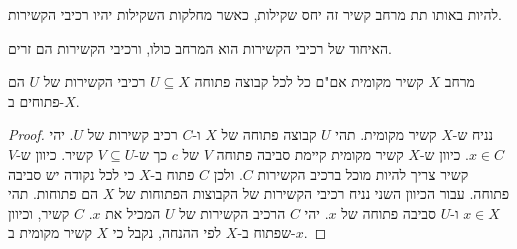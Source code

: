 \documentclass{tstextbook}
\begin{document}
\begin{proposition}
להיות באותו תת מרחב קשיר זה יחס שקילות, כאשר מחלקות השקילות יהיו רכיבי הקשירות.

\end{proposition}
\begin{corollary}
האיחוד של רכיבי הקשירות הוא המרחב כולו, ורכיבי הקשירות הם זרים.

\end{corollary}
\begin{proposition}
מרחב \(X\) קשיר מקומית אם"ם כל לכל קבוצה פתוחה \(U\subseteq X\) רכיבי הקשירות של \(U\) הם פתוחים ב-\(X\).

\end{proposition}
\begin{proof}
נניח ש-\(X\) קשיר מקומית. תהי \(U\) קבוצה פתוחה של \(X\) ו-\(C\) רכיב קשירות של \(U\). יהי \(x \in C\). כיוון ש-\(X\) קשיר מקומית קיימת סביבה פתוחה \(V\) של \(c\) כך ש-\(V\subseteq U\) קשיר. כיוון ש-\(V\) קשיר צריך להיות מוכל ברכיב הקשירות \(C\). ולכן \(C\) פתוח ב-\(X\) כי לכל נקודה יש סביבה פתוחה.
עבור הכיוון השני נניח רכיבי הקשירות של הקבוצות הפתוחות של \(X\) הם פתוחות. תהי \(x \in X\) ו-\(U\) סביבה פתוחה של \(x\). יהי \(C\) הרכיב הקשירות של \(U\) המכיל את \(x\). \(C\) קשיר, וכיוון שפתוח ב-\(X\) לפי ההנחה, נקבל כי \(X\) קשיר מקומית ב-\(x\).

\end{proof}
\end{document}
